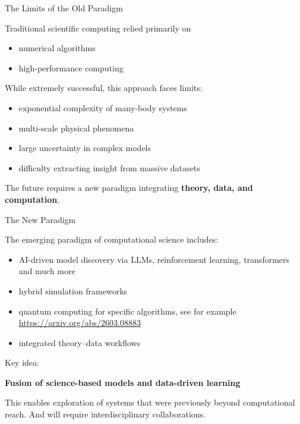 \documentclass{beamer}
\begin{document}

\begin{frame}{The Limits of the Old Paradigm}

Traditional scientific computing relied primarily on

\begin{itemize}
\item numerical algorithms
\item high-performance computing
\end{itemize}

While extremely successful, this approach faces limits:

\begin{itemize}
\item exponential complexity of many-body systems
\item multi-scale physical phenomena
\item large uncertainty in complex models
\item difficulty extracting insight from massive datasets
\end{itemize}

The future requires a new paradigm integrating
\textbf{theory, data, and computation}. 

\end{frame}


\begin{frame}{The New Paradigm}

The emerging paradigm of computational science includes:

\begin{itemize}
\item AI-driven model discovery via LLMs, reinforcement learning, transformers and much more
\item hybrid simulation frameworks
\item quantum computing for specific algorithms, see for example \url{https://arxiv.org/abs/2603.08883}
\item integrated theory–data workflows
\end{itemize}

Key idea:

\begin{center}
\textbf{Fusion of science-based models and data-driven learning}
\end{center}

This enables exploration of systems that were previously
beyond computational reach. And will require interdisciplinary collaborations.

\end{frame}
\end{document}
